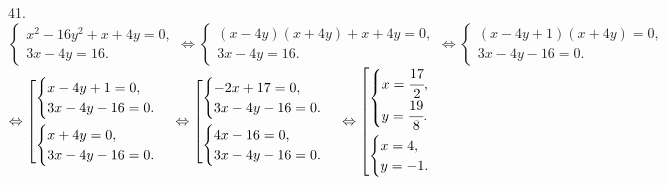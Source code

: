 41. $\begin{cases}
x^2-16y^2+x+4y=0,\\
3x-4y=16.
\end{cases}\Leftrightarrow\begin{cases}
(x-4y)(x+4y)+x+4y=0,\\
3x-4y=16.
\end{cases}\Leftrightarrow\begin{cases}
(x-4y+1)(x+4y)=0,\\
3x-4y-16=0.
\end{cases}$\\$\Leftrightarrow \left[
      \begin{gathered} \begin{cases}x-4y+1=0,\\3x-4y-16=0.\end{cases}\hfill\\
      \begin{cases}x+4y=0,\\3x-4y-16=0.\end{cases}\hfill \end{gathered}\right.\Leftrightarrow \left[
      \begin{gathered} \begin{cases}-2x+17=0,\\3x-4y-16=0.\end{cases}\hfill\\
      \begin{cases}4x-16=0,\\3x-4y-16=0.\end{cases}\hfill \end{gathered}\right.\Leftrightarrow \left[
      \begin{gathered} \begin{cases}x=\cfrac{17}{2},\\y=\cfrac{19}{8}.\end{cases}\hfill\\
      \begin{cases}x=4,\\y=-1.\end{cases}\hfill \end{gathered}\right.$\\
